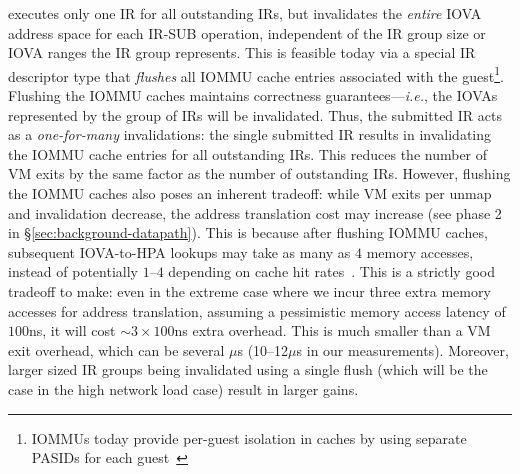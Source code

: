 {\name} executes only one IR for all outstanding IRs, 
    but invalidates the {\em entire} IOVA address space for each IR-SUB operation, 
    independent of the IR group size or IOVA ranges the IR group represents. 
This is feasible today via a special IR descriptor type that 
    {\em flushes} all IOMMU cache entries associated with the guest\footnote{IOMMUs today provide 
        per-guest isolation in caches by using separate PASIDs for each guest~\cite{Zhang2024HDIOV}}. 
%
%
Flushing the IOMMU caches maintains correctness guarantees---\textit{i.e.}, the IOVAs represented by 
    the group of IRs will be invalidated. 
Thus, the submitted IR acts as a {\it one-for-many} invalidations: 
    the single submitted IR results in invalidating the IOMMU cache entries for all outstanding IRs. 
This reduces the number of VM exits by the same factor as the number of outstanding IRs. 
However, flushing the IOMMU caches also poses an inherent tradeoff: 
    while VM exits per unmap and invalidation decrease, the address translation cost may 
    increase (see phase 2 in \S\ref{sec:background-datapath}). 
This is because after flushing IOMMU caches, subsequent IOVA-to-HPA lookups may take as many as $4$ memory accesses, 
    instead of potentially $1$--$4$ depending on cache hit rates~\cite{Rubin2024FastSafe}. 
This is a strictly good tradeoff to make: even in the extreme case 
    where we incur three extra memory accesses for address translation, 
    assuming a pessimistic memory access latency of $100$ns, 
    it will cost ${\sim}3\times100$ns extra overhead. 
This is much smaller than a VM exit overhead, which can be several $\mu$s (10--12$\mu$s in our measurements).  
Moreover, larger sized IR groups being invalidated using a single flush (which will be the case in the high network load case) result in larger gains. 

